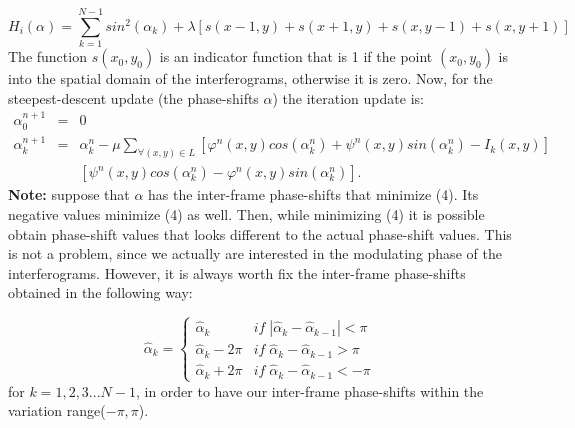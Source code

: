 \begin{equation}
H_{i}(\alpha)=\sum_{k=1}^{N-1}sin^{2}(\alpha_{k})+\lambda[s(x-1,y)+s(x+1,y)+s(x,
y-1)+s(x,y+1)]
\end{equation}
The function $s(x_{0},y_{0})$ is an indicator function that is 1
if the point $(x_{0},y_{0})$ is into the spatial domain of the interferograms,
otherwise it is zero. Now, for the steepest-descent update (the phase-shifts
$\alpha$) the iteration update is:
\begin{eqnarray}
\alpha_{0}^{n+1} & = & 0\\
\alpha_{k}^{n+1} & = & \alpha_{k}^{n}-\mu\sum_{\forall(x,y)\in L}[\varphi^{n}(x,
y)cos(\alpha_{k}^{n})+\psi^{n}(x,y)sin(\alpha_{k}^{n})-I_{k}(x,y)]\\
 &  & [\psi^{n}(x,y)cos(\alpha_{k}^{n})-\varphi^{n}(x,y)sin(\alpha_{k}^{n})].
\nonumber 
\end{eqnarray}
\textbf{Note:} suppose that $\alpha$ has the inter-frame phase-shifts
that minimize (4). Its negative values minimize (4) as well. Then,
while minimizing (4) it is possible obtain phase-shift values that
looks different to the actual phase-shift values. This is not a problem,
since we actually are interested in the modulating phase of the interferograms.
However, it is always worth fix the inter-frame phase-shifts obtained
in the following way:

\begin{equation}
\widehat{\alpha}_{k}=\begin{cases}
\widehat{\alpha}_{k} & if\;|\widehat{\alpha}_{k}-\widehat{\alpha}_{k-1}|<\pi\\
\widehat{\alpha}_{k}-2\pi &
if\;\widehat{\alpha}_{k}-\widehat{\alpha}_{k-1}>\pi\\
\widehat{\alpha}_{k}+2\pi & if\;\widehat{\alpha}_{k}-\widehat{\alpha}_{k-1}<-\pi
\end{cases}
\end{equation}
for $k=1,2,3...N-1$, in order to have our inter-frame
phase-shifts within the variation range($-\pi,\pi$).


%
%






